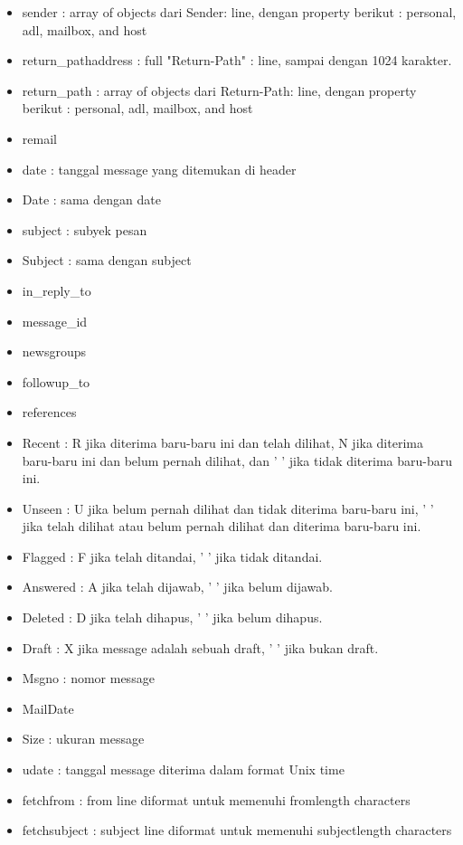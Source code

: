 \begin{itemize}
\begin{itemize}
\begin{itemize}
 \item sender : array of objects dari Sender: line, dengan property berikut : personal, adl, mailbox, and host
 \item return\_pathaddress  : full "Return-Path" : line, sampai dengan 1024 karakter.
 \item return\_path : array of objects dari Return-Path: line, dengan property berikut : personal, adl, mailbox, and host
 \item remail
 \item date : tanggal message yang ditemukan di header
 \item Date : sama dengan date
 \item subject : subyek pesan
 \item Subject : sama dengan subject
 \item in\_reply\_to
 \item message\_id
 \item newsgroups
 \item followup\_to
 \item references
 \item Recent : R jika diterima baru-baru ini dan telah dilihat, N jika diterima baru-baru ini dan belum pernah dilihat, dan ' ' jika tidak diterima baru-baru ini.
 \item Unseen : U jika belum pernah dilihat dan tidak diterima baru-baru ini, ' ' jika telah dilihat atau belum pernah dilihat dan diterima baru-baru ini.
 \item Flagged : F jika telah ditandai, ' ' jika tidak ditandai.
 \item Answered : A jika telah dijawab, ' ' jika belum dijawab.
 \item Deleted : D jika telah dihapus, ' ' jika belum dihapus.
 \item Draft : X jika message adalah sebuah draft, ' ' jika bukan draft.
 \item Msgno : nomor message
 \item MailDate
 \item Size : ukuran message
 \item udate : tanggal message diterima dalam format Unix time
 \item fetchfrom : from line diformat untuk memenuhi fromlength characters
 \item fetchsubject : subject line diformat untuk memenuhi subjectlength characters
 \end{itemize}
\end{itemize}
 


\end{itemize}
